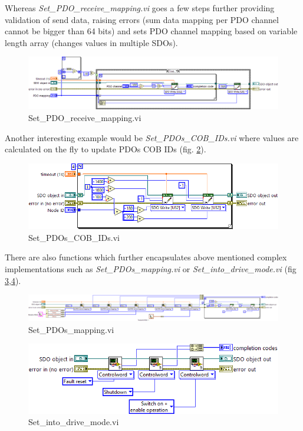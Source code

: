 Whereas \textit{Set\_PDO\_receive\_mapping.vi} goes a few steps further providing validation of send data, raising errors (sum data mapping per PDO channel cannot be bigger than 64 bits) and sets PDO channel mapping based on variable length array (changes values in multiple SDOs).
\begin{figure}[H]
    \centering
    \includegraphics[scale=\visc,max width=\textwidth]{figures/Set_PDO_recive_mappingd}
    \caption{Set\_PDO\_receive\_mapping.vi}
    \label{vi:Set_PDO_recive_mapping}
\end{figure}
Another interesting example would be \textit{Set\_PDOs\_COB\_IDs.vi} where values are calculated on the fly to update PDOs COB IDs (fig. \ref{vi:Set_PDOs_COB_IDs}).
\begin{figure}[H]
    \centering
    \includegraphics[scale=\visc,max width=\textwidth]{figures/Set_PDOs_COB_IDsd}
    \caption{Set\_PDOs\_COB\_IDs.vi}
    \label{vi:Set_PDOs_COB_IDs}
\end{figure}
There are also functions which further encapsulates above mentioned complex implementations such as \textit{Set\_PDOs\_mapping.vi} or \textit{Set\_into\_drive\_mode.vi} (fig \ref{vi:Set_PDOs_mapping},\ref{vi:Set_into_drive_mode}).
\begin{figure}[H]
    \centering
    \includegraphics[scale=\visc,max width=\textwidth]{figures/Set_PDOs_mappingd}
    \caption{Set\_PDOs\_mapping.vi}
    \label{vi:Set_PDOs_mapping}
\end{figure}
\begin{figure}[H]
    \centering
    \includegraphics[scale=\visc,max width=\textwidth]{figures/Set_into_drive_moded}
    \caption{Set\_into\_drive\_mode.vi}
    \label{vi:Set_into_drive_mode}
\end{figure}

